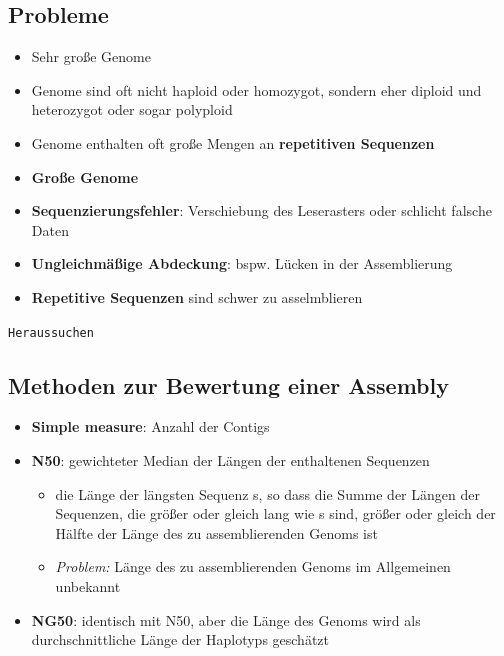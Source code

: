 \subsection{Probleme}
\begin{itemize}
    \item Sehr große Genome
    \item Genome sind oft nicht haploid oder homozygot, sondern eher diploid und heterozygot oder sogar polyploid
    \item Genome enthalten oft große Mengen an \textbf{repetitiven Sequenzen}
\end{itemize}
\begin{mechanism}[title=Welche Probleme können bei Gen Assembly auftreten?]
\begin{itemize}
    \item \textbf{Große Genome}
    \item \textbf{Sequenzierungsfehler}: Verschiebung des Leserasters oder schlicht falsche Daten 
    \item \textbf{Ungleichmäßige Abdeckung}: bspw. Lücken in der Assemblierung
    \item \textbf{Repetitive Sequenzen} sind schwer zu asselmblieren
\end{itemize}
\end{mechanism}

\begin{mybox}[title=Auswirkungen der Ploidie auf die Seuenzierung]
\texttt{Heraussuchen} %
\end{mybox} 

\subsection{Methoden zur Bewertung einer Assembly}
\begin{itemize}
    \item \textbf{Simple measure}: Anzahl der Contigs
    \item \textbf{N50}: gewichteter Median der Längen der enthaltenen Sequenzen
    \begin{itemize}
        \item die Länge der längsten Sequenz s, so dass die Summe der Längen der Sequenzen, die größer oder gleich lang wie s sind, größer oder gleich der Hälfte der Länge des zu assemblierenden Genoms ist
        \item \textit{Problem:} Länge des zu assemblierenden Genoms im Allgemeinen unbekannt
    \end{itemize}
    \item \textbf{NG50}: identisch mit N50, aber die Länge des Genoms wird als durchschnittliche Länge der \glspl{Haplotyp} geschätzt
\end{itemize} 


